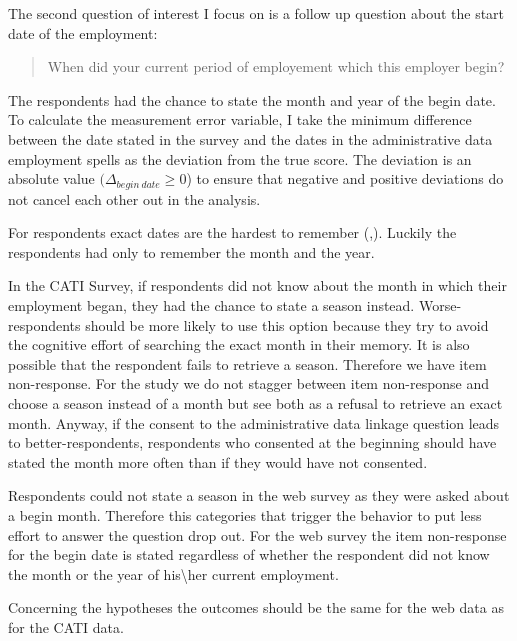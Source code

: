 The second question of interest I focus on is a follow up question about the start date of the employment:


\begin{quote}
\begin {small}

When did your current period of employement which this employer begin?

\end{small}
\end{quote}

The respondents had the chance to state the month and year of the begin date. To calculate the measurement error variable, I take the minimum difference between the date stated in the survey and the dates in the administrative data employment spells as the deviation from the true score. The deviation is an absolute value \((\Delta_{begin \ date}\geq0\)) to ensure that negative and positive deviations do not cancel each other out in the analysis.

For respondents exact dates are the hardest to remember (\cite{Wagenaar86},\cite{Friedman93}). Luckily the respondents had only to remember the month and the year.

In the CATI Survey, if respondents did not know about the month in which their employment began, they had the chance to state a season instead. Worse-respondents should be more likely to use this option because they try to avoid the cognitive effort of searching the exact month in their memory. It is also possible that the respondent fails to retrieve a season. Therefore we have item non-response. For the study we do not stagger between item non-response and choose a season instead of a month but see both as a refusal to retrieve an exact month. Anyway, if the consent to the administrative data linkage question leads to better-respondents, respondents who consented at the beginning should have stated the month more often than if they would have not consented.

Respondents could not state a season in the web survey as they were asked about a begin month. Therefore this categories that trigger the behavior to put less effort to answer the question drop out. For the web survey the item non-response for the begin date is stated regardless of whether the respondent did not know the month or the year of his\textbackslash her current employment.

Concerning the hypotheses the outcomes should be the same for the web data as for the CATI data.

